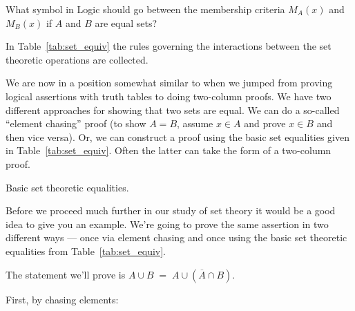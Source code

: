 \begin{exer}
What symbol in Logic should go between the membership criteria
$M_A(x)$ and $M_B(x)$ if $A$ and $B$ are equal sets? 
\end{exer}

In Table~\ref{tab:set_equiv} the rules governing the interactions 
between the set theoretic operations are collected.
 
We are now in a position somewhat similar to when we jumped from
proving logical assertions with truth tables to doing two-column
proofs.  We have two different approaches for showing that two
sets are equal.  We can do a so-called ``element chasing'' proof
(to show $A=B$, assume $x \in A$ and prove $x \in B$ and then vice versa).
Or, we can construct a proof using the basic set equalities given
in Table~\ref{tab:set_equiv}.  Often the latter can take the form
of a two-column proof.

\begin{table}[h] 
\begin{center}

\end{center}
\caption{Basic set theoretic equalities.}
\label{tab:set_equiv}
\end{table}

\clearpage

Before we proceed much further in our study of set theory it would be a
good idea to give you an example.  We're going to prove the same assertion
in two different ways --- once via element chasing and once using the 
basic set theoretic equalities from Table~\ref{tab:set_equiv}.

The statement we'll prove is $A \cup B \; = \; A \cup (\overline{A} \cap B)$.

First, by chasing elements:

